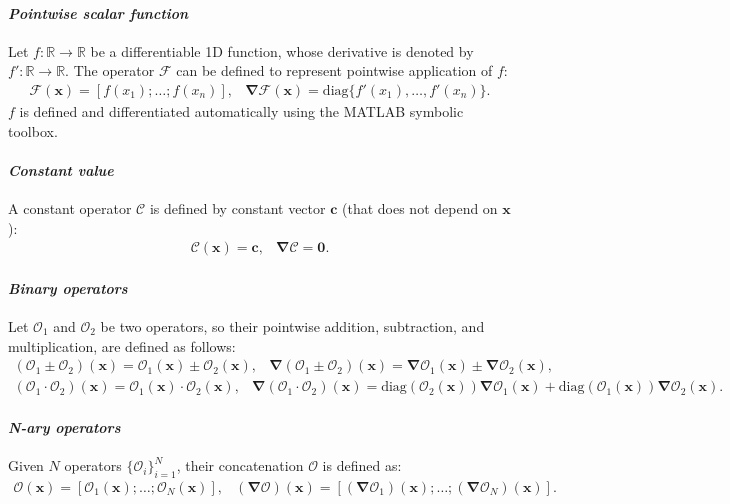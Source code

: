 \documentclass[10pt]{ijnam}
\newcommand{\diag}{\ensuremath{\mathrm{diag}}}
\newcommand{\R}{\ensuremath{\mathbb{R}}}
\newcommand\bnabla{\boldsymbol{\nabla}}
\newcommand\bx{\boldsymbol{x}}
\newcommand\bc{\boldsymbol{c}}
\newcommand\bzero{\boldsymbol{0}}
\newcommand\cF{\mathcal{F}}
\newcommand\cO{\mathcal{O}}
\begin{document}
\paragraph{\textit{Pointwise scalar function}}
Let $f: \R \rightarrow \R$ be a differentiable 1D function, whose derivative is
denoted by $f': \R \rightarrow \R$. The operator $\cF$ can be defined to
represent pointwise application of $f$:
\begin{equation}\begin{array}{cc}
\cF(\bx) = [f(x_1); \ldots; f(x_n)], &
\bnabla\cF(\bx) = \diag\{f'(x_1), \ldots, f'(x_n)\}.
\end{array}\end{equation}
$f$ is defined and differentiated automatically using the MATLAB symbolic toolbox.

\paragraph{\textit{Constant value}}
A constant operator $\mathcal{C}$ is defined by constant vector $\bc$ 
(that does not depend on $\bx$):
\begin{equation}\begin{array}{cc}
\mathcal{C}(\bx) = \bc, &
\bnabla\mathcal{C} = \bzero.
\end{array}\end{equation}

\paragraph{\textit{Binary operators}}
Let $\cO_1$ and $\cO_2$ be two operators, so their pointwise addition, subtraction,
and multiplication, are defined as follows:
\begin{equation}\begin{array}{cc}
(\cO_1 \pm \cO_2)(\bx) = \cO_1(\bx) \pm \cO_2(\bx), &
\bnabla (\cO_1 \pm \cO_2)(\bx) = \bnabla\cO_1(\bx) \pm \bnabla\cO_2(\bx),
\end{array}\end{equation}
\begin{equation}\begin{array}{cc}
(\cO_1 \cdot \cO_2)(\bx) = \cO_1(\bx) \cdot \cO_2(\bx), &
\bnabla (\cO_1 \cdot \cO_2)(\bx) = \diag(\cO_2(\bx)) \bnabla\cO_1(\bx) 
                                  + \diag(\cO_1(\bx)) \bnabla\cO_2(\bx).
\end{array}\end{equation}
\paragraph{\textit{N-ary operators}}
Given $N$ operators $\{\cO_i\}_{i=1}^N$, their concatenation $\cO$ is defined as:
\begin{equation}\begin{array}{cc}
\cO(\bx) = [\cO_1(\bx); \ldots; \cO_N(\bx)], &
(\bnabla\cO)(\bx) = [(\bnabla\cO_1)(\bx); \ldots; (\bnabla\cO_N)(\bx)].
\end{array}\end{equation}
\end{document}
